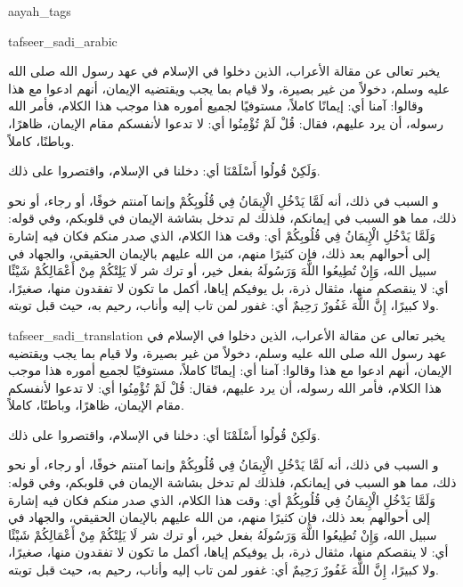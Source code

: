 \begin{taggedblock}{aayah_tags}
\end{taggedblock}
\begin{taggedblock}{tafseer_sadi_arabic}
\begin{Arabic}
يخبر تعالى عن مقالة الأعراب، الذين دخلوا في الإسلام في عهد رسول الله صلى الله عليه وسلم، دخولاً من غير بصيرة، ولا قيام بما يجب ويقتضيه الإيمان، أنهم ادعوا مع هذا وقالوا: آمنا أي: إيمانًا كاملاً، مستوفيًا لجميع أموره هذا موجب هذا الكلام، فأمر الله رسوله، أن يرد عليهم، فقال:
{ قُلْ لَمْ تُؤْمِنُوا }
أي: لا تدعوا لأنفسكم مقام الإيمان، ظاهرًا، وباطنًا، كاملاً.

{ وَلَكِنْ قُولُوا أَسْلَمْنَا }
أي: دخلنا في الإسلام، واقتصروا على ذلك.

{ و }
السبب في ذلك، أنه
{ لَمَّا يَدْخُلِ الْإِيمَانُ فِي قُلُوبِكُمْ }
وإنما آمنتم خوفًا، أو رجاء، أو نحو ذلك، مما هو السبب في إيمانكم، فلذلك لم تدخل بشاشة الإيمان في قلوبكم، وفي قوله:
{ وَلَمَّا يَدْخُلِ الْإِيمَانُ فِي قُلُوبِكُمْ }
أي: وقت هذا الكلام، الذي صدر منكم فكان فيه إشارة إلى أحوالهم بعد ذلك، فإن كثيرًا منهم، من الله عليهم بالإيمان الحقيقي، والجهاد في سبيل الله،
{ وَإِنْ تُطِيعُوا اللَّهَ وَرَسُولَهُ }
بفعل خير، أو ترك شر
{ لَا يَلِتْكُمْ مِنْ أَعْمَالِكُمْ شَيْئًا }
أي: لا ينقصكم منها، مثقال ذرة، بل يوفيكم إياها، أكمل ما تكون لا تفقدون منها، صغيرًا، ولا كبيرًا،
{ إِنَّ اللَّهَ غَفُورٌ رَحِيمٌ }
أي: غفور لمن تاب إليه وأناب، رحيم به، حيث قبل توبته.
\end{Arabic}
\end{taggedblock}
\begin{taggedblock}{tafseer_sadi_translation}
يخبر تعالى عن مقالة الأعراب، الذين دخلوا في الإسلام في عهد رسول الله صلى الله عليه وسلم، دخولاً من غير بصيرة، ولا قيام بما يجب ويقتضيه الإيمان، أنهم ادعوا مع هذا وقالوا: آمنا أي: إيمانًا كاملاً، مستوفيًا لجميع أموره هذا موجب هذا الكلام، فأمر الله رسوله، أن يرد عليهم، فقال:
{ قُلْ لَمْ تُؤْمِنُوا }
أي: لا تدعوا لأنفسكم مقام الإيمان، ظاهرًا، وباطنًا، كاملاً.

{ وَلَكِنْ قُولُوا أَسْلَمْنَا }
أي: دخلنا في الإسلام، واقتصروا على ذلك.

{ و }
السبب في ذلك، أنه
{ لَمَّا يَدْخُلِ الْإِيمَانُ فِي قُلُوبِكُمْ }
وإنما آمنتم خوفًا، أو رجاء، أو نحو ذلك، مما هو السبب في إيمانكم، فلذلك لم تدخل بشاشة الإيمان في قلوبكم، وفي قوله:
{ وَلَمَّا يَدْخُلِ الْإِيمَانُ فِي قُلُوبِكُمْ }
أي: وقت هذا الكلام، الذي صدر منكم فكان فيه إشارة إلى أحوالهم بعد ذلك، فإن كثيرًا منهم، من الله عليهم بالإيمان الحقيقي، والجهاد في سبيل الله،
{ وَإِنْ تُطِيعُوا اللَّهَ وَرَسُولَهُ }
بفعل خير، أو ترك شر
{ لَا يَلِتْكُمْ مِنْ أَعْمَالِكُمْ شَيْئًا }
أي: لا ينقصكم منها، مثقال ذرة، بل يوفيكم إياها، أكمل ما تكون لا تفقدون منها، صغيرًا، ولا كبيرًا،
{ إِنَّ اللَّهَ غَفُورٌ رَحِيمٌ }
أي: غفور لمن تاب إليه وأناب، رحيم به، حيث قبل توبته.
\end{taggedblock}

\begin{comment}
Please use the following for footnotes:- Sample\footnoteQ{Text of Qur'an footnote goes here.}.
Sample\footnoteT{Text of Tafseer footnote goes here.}.
\end{comment}